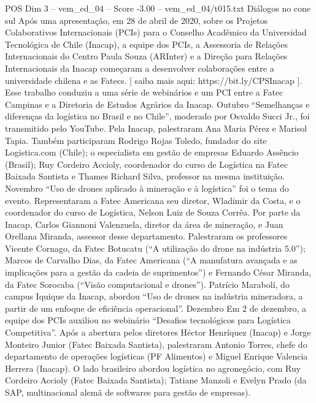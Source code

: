 \begin{textsample}{POS Dim 3 – vem\_ed\_04 – Score -3.00 – vem\_ed\_04/t015.txt}  \label{ex:f3_pos_093}
Diálogos no cone sul Após uma apresentação, em 28 de abril de 2020, sobre os Projetos Colaborativos Internacionais (PCIs) para o Conselho Acadêmico da Universidad Tecnológica de Chile (Inacap), a equipe dos PCIs, a Assessoria de Relações Internacionais do Centro Paula Souza (ARInter) e a Direção para Relações Internacionais da Inacap começaram a desenvolver colaborações entre a universidade chilena e as Fatecs. [ saiba mais aqui: https://bit.ly/CPSInacap ].
Esse trabalho conduziu a uma série de webinários e um PCI entre a Fatec Campinas e a Diretoria de Estudos Agrários da Inacap.
Outubro “Semelhanças e diferenças da logística no Brasil e no Chile”, moderado por Osvaldo Succi Jr., foi transmitido pelo YouTube.
Pela Inacap, palestraram Ana Maria Pérez e Marisol Tapia.
Também participaram Rodrigo Rojas Toledo, fundador do site Logistica.com (Chile); o especialista em gestão de empresas Eduardo Assêncio (Brasil); Ruy Cordeiro Accioly, coordenador do curso de Logística na Fatec Baixada Santista e Thames Richard Silva, professor na mesma instituição.
Novembro “Uso de drones aplicado à mineração e à logística” foi o tema do evento.
Representaram a Fatec Americana seu diretor, Wladimir da Costa, e o coordenador do curso de Logística, Nelson Luiz de Souza Corrêa.
Por parte da Inacap, Carlos Giannoni Valenzuela, diretor da área de mineração, e Juan Orellana Miranda, assessor desse departamento.
Palestraram os professores Vicente Cornago, da Fatec Botucatu (“A utilização do drone na indústria 5.0”); Marcos de Carvalho Dias, da Fatec Americana (“A manufatura avançada e as implicações para a gestão da cadeia de suprimentos”) e Fernando César Miranda, da Fatec Sorocaba (“Visão computacional e drones”).
Patrício Marabolí, do campus Iquique da Inacap, abordou “Uso de drones na indústria mineradora, a partir de um enfoque de eficiência operacional”.
Dezembro Em 2 de dezembro, a equipe dos PCIs auxiliou no webinário “Desafios tecnológicos para Logística Competitiva”.
Após a abertura pelos diretores Héctor Henríquez (Inacap) e Jorge Monteiro Junior (Fatec Baixada Santista), palestraram Antonio Torres, chefe do departamento de operações logísticas (PF Alimentos) e Miguel Enrique Valencia Herrera (Inacap).
O lado brasileiro abordou logística no agronegócio, com Ruy Cordeiro Accioly (Fatec Baixada Santista); Tatiane Manzoli e Evelyn Prado (da SAP, multinacional alemã de softwares para gestão de empresas).

\end{textsample}
